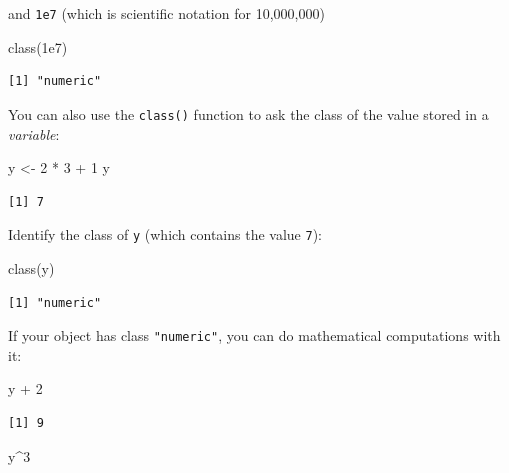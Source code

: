 \documentclass[
  letterpaper,
  DIV=11,
  numbers=noendperiod]{scrreprt}
\newenvironment{Shaded}{\begin{snugshade}}{\end{snugshade}}
\newcommand{\DecValTok}[1]{\textcolor[rgb]{0.68,0.00,0.00}{#1}}
\newcommand{\FloatTok}[1]{\textcolor[rgb]{0.68,0.00,0.00}{#1}}
\newcommand{\FunctionTok}[1]{\textcolor[rgb]{0.28,0.35,0.67}{#1}}
\newcommand{\NormalTok}[1]{\textcolor[rgb]{0.00,0.23,0.31}{#1}}
\newcommand{\OtherTok}[1]{\textcolor[rgb]{0.00,0.23,0.31}{#1}}
\newcommand{\SpecialCharTok}[1]{\textcolor[rgb]{0.37,0.37,0.37}{#1}}
\begin{document}
and \texttt{1e7} (which is scientific notation for 10,000,000)

\begin{Shaded}
\begin{Highlighting}[]
\FunctionTok{class}\NormalTok{(}\FloatTok{1e7}\NormalTok{)}
\end{Highlighting}
\end{Shaded}

\begin{verbatim}
[1] "numeric"
\end{verbatim}

You can also use the \texttt{class()} function to ask the class of the
value stored in a \emph{variable}:

\begin{Shaded}
\begin{Highlighting}[]
\NormalTok{y }\OtherTok{\textless{}{-}} \DecValTok{2} \SpecialCharTok{*} \DecValTok{3} \SpecialCharTok{+} \DecValTok{1}
\NormalTok{y}
\end{Highlighting}
\end{Shaded}

\begin{verbatim}
[1] 7
\end{verbatim}

Identify the class of \texttt{y} (which contains the value \texttt{7}):

\begin{Shaded}
\begin{Highlighting}[]
\FunctionTok{class}\NormalTok{(y)}
\end{Highlighting}
\end{Shaded}

\begin{verbatim}
[1] "numeric"
\end{verbatim}

If your object has class \texttt{"numeric"}, you can do mathematical
computations with it:

\begin{Shaded}
\begin{Highlighting}[]
\NormalTok{y }\SpecialCharTok{+} \DecValTok{2}
\end{Highlighting}
\end{Shaded}

\begin{verbatim}
[1] 9
\end{verbatim}

\begin{Shaded}
\begin{Highlighting}[]
\NormalTok{y}\SpecialCharTok{\^{}}\DecValTok{3}
\end{Highlighting}
\end{Shaded}
\end{document}

